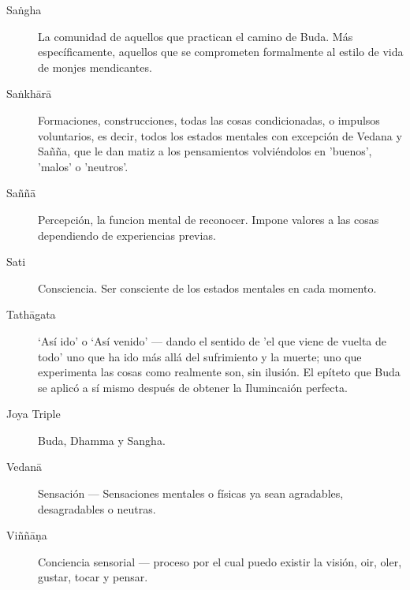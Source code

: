 \begin{description}
\item[Saṅgha] La comunidad de aquellos que practican el camino de Buda.
  Más específicamente, aquellos que se comprometen formalmente al estilo de vida de monjes mendicantes.

\item[Saṅkhārā] Formaciones, construcciones, todas las cosas condicionadas, o impulsos voluntarios, es decir, todos los estados mentales con excepción de Vedana y Sañña, que le dan matiz a los pensamientos volviéndolos en 'buenos', 'malos' o 'neutros'.

\item[Saññā] Percepción, la funcion mental de reconocer. Impone valores a las cosas dependiendo de experiencias previas.

\item[Sati] Consciencia. Ser consciente de los estados mentales en cada momento.

\item[Tathāgata] ‘Así ido’ o ‘Así venido’ --- dando el sentido de 'el que viene de vuelta de todo' uno que ha ido más allá del sufrimiento y la muerte; uno que experimenta las cosas como realmente son, sin ilusión. El epíteto que Buda se aplicó a sí mismo después de obtener la Ilumincaión perfecta.

\item[Joya Triple] Buda, Dhamma y Sangha.

\item[Vedanā] Sensación --- Sensaciones mentales o físicas ya sean agradables, desagradables o neutras.

\item[Viññāṇa] Conciencia sensorial --- proceso por el cual puedo existir la visión, oir, oler, gustar, tocar y pensar.

\end{description}

